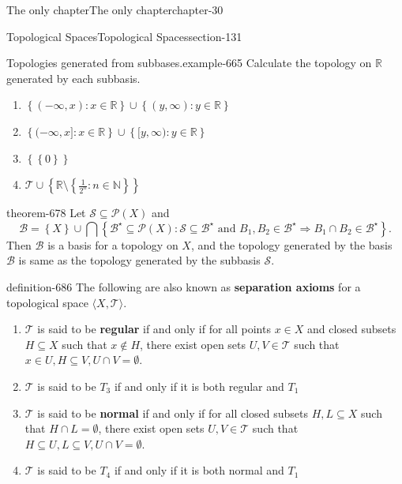 \documentclass[oneside,10pt,]{book}
\newcommand{\terminology}[1]{\textbf{#1}}
\newcommand{\tuple}[1]{\langle #1 \rangle}
\newcommand{\mb}{\mathbb}
\newcommand{\mc}{\mathcal}
\newcommand{\setBuilder}[2]{\left\{#1:#2\right\}}
\newcommand{\setList}[1]{\left\{#1\right\}}
\begin{document}
\begin{chapterptx}{The only chapter}{}{The only chapter}{}{}{chapter-30}
\begin{sectionptx}{Topological Spaces}{}{Topological Spaces}{}{}{section-131}
\begin{example}{Topologies generated from subbases.}{example-665}
\hypertarget{p-667}{}%
Calculate the topology on \(\mb R\) generated by each subbasis.%
\leavevmode%
\begin{enumerate}
\item\hypertarget{li-670}{}\(\setBuilder{(-\infty,x)}{x\in\mb R}\cup\setBuilder{(y,\infty)}{y\in\mb R}\)%
\item\hypertarget{li-672}{}\(\setBuilder{(-\infty,x]}{x\in\mb R}\cup\setBuilder{[y,\infty)}{y\in\mb R}\)%
\item\hypertarget{li-674}{}\(\setList{\setList{0}}\)%
\item\hypertarget{li-676}{}\(\mc T\cup\setList{\mb R\setminus\setBuilder{\frac{1}{2^n}}{n\in\mb N}}\)%
\end{enumerate}
\end{example}
\begin{theorem}{}{}{theorem-678}%
\hypertarget{p-679}{}%
Let \(\mc S\subseteq\mc P(X)\) and%
\begin{equation*}
\mc B=\setList{X}\cup\bigcap\setBuilder{\mc B^\star\subseteq\mc P(X)}
{\mc S\subseteq\mc B^\star\text{ and }
B_1,B_2\in\mc B^\star\Rightarrow B_1\cap B_2\in\mc B^\star}.
\end{equation*}
Then \(\mc B\) is a basis for a topology on \(X\), and the topology generated by the basis \(\mc B\) is same as the topology generated by the subbasis \(\mc S\).%
\end{theorem}
\begin{definition}{}{definition-686}%
\hypertarget{p-687}{}%
The following are also known as \terminology{separation axioms} for a topological space \(\tuple{X,\mc T}\).%
\leavevmode%
\begin{enumerate}
\item\hypertarget{li-691}{}\(\mc T\) is said to be \terminology{regular} if and only if for all points \(x\in X\) and closed subsets \(H\subseteq X\) such that \(x\not\in H\), there exist open sets \(U,V\in\mc T\) such that \(x\in U,H\subseteq V,U\cap V=\emptyset\).%
\item\hypertarget{li-699}{}\(\mc T\) is said to be \terminology{\(T_3\)} if and only if it is both regular and \(T_1\)%
\item\hypertarget{li-704}{}\(\mc T\) is said to be \terminology{normal} if and only if for all closed subsets \(H,L\subseteq X\) such that \(H\cap L=\emptyset\), there exist open sets \(U,V\in\mc T\) such that \(H\subseteq U,L\subseteq V,U\cap V=\emptyset\).%
\item\hypertarget{li-711}{}\(\mc T\) is said to be \terminology{\(T_4\)} if and only if it is both normal and \(T_1\)%

\end{enumerate}
\end{definition}
\end{sectionptx}
\end{chapterptx}
\end{document}
